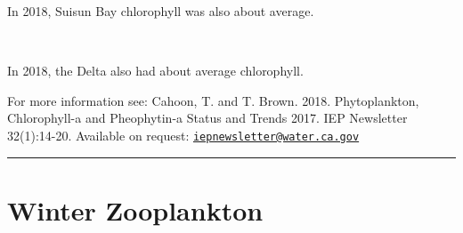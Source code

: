 \documentclass[
]{book}
\begin{document}
\begin{panel-grid}
\begin{columns-nocenter}
\begin{column40}
\end{column40}

\begin{column800}

In 2018, Suisun Bay chlorophyll was also about average.

\end{column800}

\begin{column40}

~

\end{column40}

\begin{column800}

In 2018, the Delta also had about average chlorophyll.

\end{column800}

\end{columns-nocenter}

\end{panel-grid}

\begin{disclaimer}
For more information see: Cahoon, T. and T. Brown. 2018. Phytoplankton,
Chlorophyll-a and Pheophytin-a Status and Trends 2017. IEP Newsletter
32(1):14-20. Available on request:
\href{mailto:iepnewsletter@water.ca.gov}{\nolinkurl{iepnewsletter@water.ca.gov}}
\end{disclaimer}

\begin{center}\rule{0.5\linewidth}{0.5pt}\end{center}

\hypertarget{winter-zooplankton}{%
\section{Winter Zooplankton}\label{winter-zooplankton}}
\end{document}
